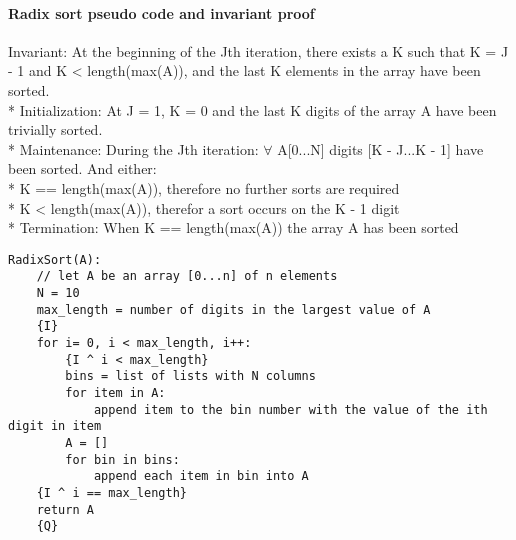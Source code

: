 \documentclass[10pt,letterpaper]{report}
\begin{document}
	\paragraph{Radix sort pseudo code and invariant proof}
	Invariant: At the beginning of the Jth iteration, there exists a K such that K = J - 1 and K < length(max(A)), and the last K elements in the array have been sorted.
	\\* Initialization:  At J = 1, K = 0 and the last K digits of the array A have been trivially sorted. 
	\\* Maintenance: During the Jth iteration: $ \forall $ A[0...N] digits [K - J...K - 1] have been sorted. And either:
	\\* K == length(max(A)), therefore no further sorts are required
	\\* K < length(max(A)), therefor a sort occurs on the K - 1 digit
	\\* Termination: When K == length(max(A)) the array A has been sorted
	\begin{lstlisting}
RadixSort(A):
	// let A be an array [0...n] of n elements
	N = 10
	max_length = number of digits in the largest value of A
	{I}
	for i= 0, i < max_length, i++:
		{I ^ i < max_length}
		bins = list of lists with N columns
		for item in A:
			append item to the bin number with the value of the ith digit in item
		A = []
		for bin in bins:
			append each item in bin into A
	{I ^ i == max_length}
	return A
	{Q}
	\end{lstlisting}
	
\end{document}
